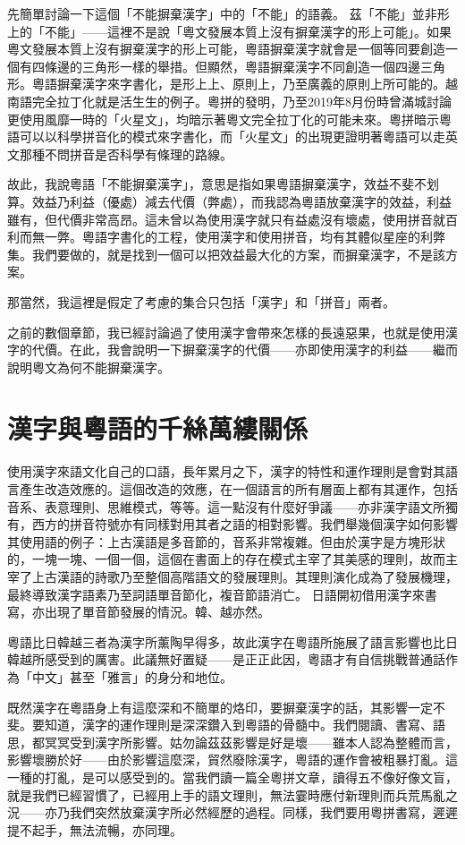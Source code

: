 \documentclass[a5paper, 12pt, openany]{book} %
\begin{document}
先簡單討論一下這個「不能摒棄漢字」中的「不能」的語義。 茲「不能」並非形上的「不能」——這裡不是說「粵文發展本質上沒有摒棄漢字的形上可能」。如果粵文發展本質上沒有摒棄漢字的形上可能，粵語摒棄漢字就會是一個等同要創造一個有四條邊的三角形一樣的舉措。但顯然，粵語摒棄漢字不同創造一個四邊三角形。粵語摒棄漢字來字書化，是形上上、原則上，乃至廣義的原則上所可能的。越南語完全拉丁化就是活生生的例子。粵拼的發明，乃至2019年8月份時曾滿城討論更使用風靡一時的「火星文」，均暗示著粵文完全拉丁化的可能未來。粵拼暗示粵語可以以科學拼音化的模式來字書化，而「火星文」的出現更證明著粵語可以走英文那種不問拼音是否科學有條理的路線。

故此，我說粵語「不能摒棄漢字」，意思是指如果粵語摒棄漢字，效益不斐不划算。效益乃利益（優處）減去代價（弊處），而我認為粵語放棄漢字的效益，利益雖有，但代價非常高昂。這未曾以為使用漢字就只有益處沒有壞處，使用拼音就百利而無一弊。粵語字書化的工程，使用漢字和使用拼音，均有其體似星座的利弊集。我們要做的，就是找到一個可以把效益最大化的方案，而摒棄漢字，不是該方案。

那當然，我這裡是假定了考慮的集合只包括「漢字」和「拼音」兩者。

之前的數個章節，我已經討論過了使用漢字會帶來怎樣的長遠惡果，也就是使用漢字的代價。在此，我會說明一下摒棄漢字的代價——亦即使用漢字的利益——繼而說明粵文為何不能摒棄漢字。

\section{漢字與粵語的千絲萬縷關係}

使用漢字來語文化自己的口語，長年累月之下，漢字的特性和運作理則是會對其語言產生改造效應的。這個改造的效應，在一個語言的所有層面上都有其運作，包括音系、表意理則、思維模式，等等。這一點沒有什麼好爭議——亦非漢字語文所獨有，西方的拼音符號亦有同樣對用其者之語的相對影響。我們舉幾個漢字如何影響其使用語的例子：上古漢語是多音節的，音系非常複雜。但由於漢字是方塊形狀的，一塊一塊、一個一個，這個在書面上的存在模式主宰了其美感的理則，故而主宰了上古漢語的詩歌乃至整個高階語文的發展理則。其理則演化成為了發展機理，最終導致漢字語素乃至詞語單音節化，複音節語消亡。 日語開初借用漢字來書寫，亦出現了單音節發展的情況。韓、越亦然。

粵語比日韓越三者為漢字所薰陶早得多，故此漢字在粵語所施展了語言影響也比日韓越所感受到的厲害。此議無好置疑——是正正此因，粵語才有自信挑戰普通話作為「中文」甚至「雅言」的身分和地位。

既然漢字在粵語身上有這麼深和不簡單的烙印，要摒棄漢字的話，其影響一定不斐。要知道，漢字的運作理則是深深鑽入到粵語的骨髓中。我們閱讀、書寫、語思，都冥冥受到漢字所影響。姑勿論茲茲影響是好是壞——雖本人認為整體而言，影響壞勝於好——由於影響這麼深，貿然廢除漢字，粵語的運作會被粗暴打亂。這一種的打亂，是可以感受到的。當我們讀一篇全粵拼文章，讀得五不像好像文盲，就是我們已經習慣了，已經用上手的語文理則，無法霎時應付新理則而兵荒馬亂之況——亦乃我們突然放棄漢字所必然經歷的過程。同樣，我們要用粵拼書寫，遲遲提不起手，無法流暢，亦同理。
\end{document}
